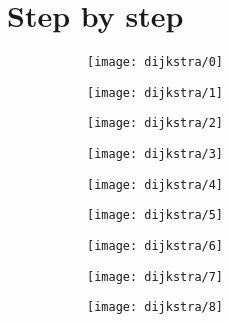 \documentclass[\main/main.tex]{subfiles}
\begin{document}
\section{Step by step}
\begin{figure}
  \begin{subfigure}{0.49\textwidth}
    \texttt{[image: dijkstra/0]}
  \end{subfigure}
  \begin{subfigure}{0.49\textwidth}
    \texttt{[image: dijkstra/1]}
  \end{subfigure}
  \begin{subfigure}{0.49\textwidth}
    \texttt{[image: dijkstra/2]}
  \end{subfigure}
  \begin{subfigure}{0.49\textwidth}
    \texttt{[image: dijkstra/3]}
  \end{subfigure}
  \begin{subfigure}{0.49\textwidth}
    \texttt{[image: dijkstra/4]}
  \end{subfigure}
  \begin{subfigure}{0.49\textwidth}
    \texttt{[image: dijkstra/5]}
  \end{subfigure}
  \begin{subfigure}{0.49\textwidth}
    \texttt{[image: dijkstra/6]}
  \end{subfigure}
  \begin{subfigure}{0.49\textwidth}
    \texttt{[image: dijkstra/7]}
  \end{subfigure}
  \begin{subfigure}{0.25\textwidth}
    \texttt{[image: dijkstra/8]}
  \end{subfigure}
\end{figure}


\clearpage
\end{document}
